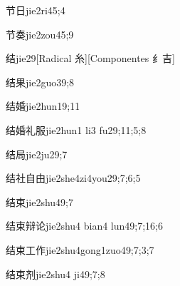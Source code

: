 \begin{verbete}{节日}{jie2ri4}{5;4}
\end{verbete}

\begin{verbete}{节奏}{jie2zou4}{5;9}
\end{verbete}

\begin{verbete}{结}{jie2}{9}[Radical 糸][Componentes 纟吉]
\end{verbete}

\begin{verbete}{结果}{jie2guo3}{9;8}
\end{verbete}

\begin{verbete}{结婚}{jie2hun1}{9;11}
\end{verbete}

\begin{verbete}{结婚礼服}{jie2hun1 li3 fu2}{9;11;5;8}
\end{verbete}

\begin{verbete}{结局}{jie2ju2}{9;7}
\end{verbete}

\begin{verbete}{结社自由}{jie2she4zi4you2}{9;7;6;5}
\end{verbete}

\begin{verbete}{结束}{jie2shu4}{9;7}
\end{verbete}

\begin{verbete}{结束辩论}{jie2shu4 bian4 lun4}{9;7;16;6}
\end{verbete}

\begin{verbete}{结束工作}{jie2shu4gong1zuo4}{9;7;3;7}
\end{verbete}

\begin{verbete}{结束剂}{jie2shu4 ji4}{9;7;8}
\end{verbete}

